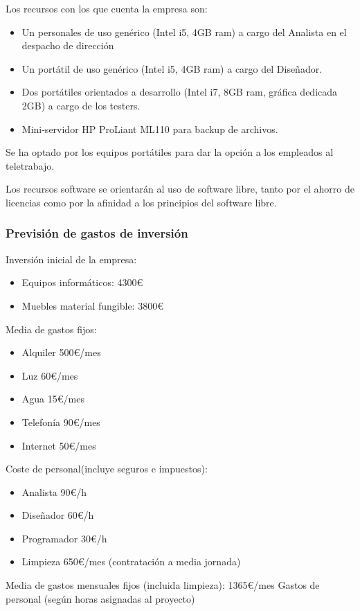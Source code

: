 Los recursos con los que cuenta la empresa son:
\begin{itemize}
\item Un personales de uso genérico (Intel i5, 4GB ram)
  a cargo del Analista en el despacho de dirección
\item Un portátil de uso genérico  (Intel i5, 4GB ram) a cargo del
  Diseñador.
\item Dos portátiles orientados a desarrollo (Intel i7, 8GB ram,
  gráfica dedicada 2GB) a cargo de los testers.
\item Mini-servidor HP ProLiant ML110 para backup de archivos.
\end{itemize}

Se ha optado por los equipos portátiles para dar la opción a los
empleados al teletrabajo.

Los recursos software se orientarán al uso de software libre, tanto
por el ahorro de licencias como por la afinidad a los principios del
software libre.

\subsubsection{Previsión de gastos de inversión}
Inversión inicial de la empresa:
\begin{itemize}
\item Equipos informáticos:      4300€
\item Muebles material fungible: 3800€
\end{itemize}

Media de gastos fijos:
\begin{itemize}
\item Alquiler 500€/mes
\item Luz       60€/mes
\item Agua      15€/mes
\item Telefonía 90€/mes
\item Internet  50€/mes
\end{itemize}

Coste de personal(incluye seguros e impuestos):
\begin{itemize}
\item Analista    90€/h
\item Diseñador   60€/h
\item Programador 30€/h
\item Limpieza   650€/mes (contratación a media jornada)
\end{itemize}

Media de gastos mensuales fijos (incluida limpieza): 1365€/mes
Gastos de personal (según horas asignadas al proyecto)


